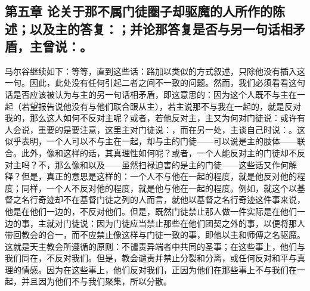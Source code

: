 \section{}


\subsection{第五章 论关于那不属门徒圈子却驱魔的人所作的陈述；以及主的答复：；并论那答复是否与另一句话相矛盾，主曾说：。}

马尔谷继续如下：等等，直到这些话：路加以类似的方式叙述，只除他没有插入这一句。因此，此处没有任何引起二者之间不一致的问题。然而，我们必须看看这句话是否应该被认为与主的另一句话相矛盾，即这意思的：因为这个人既不与主在一起（若望报告说他没有与他们联合跟从主），若主说那不与我在一起的，就是反对我的，那么这人如何不反对主呢？或者，若他反对主，主又为何对门徒说：或许有人会说，重要的是要注意，这里主对门徒说：，而在另一处，主谈自己时说：。这似乎表明，一个人可以不与主在一起，却与主的门徒——可以说是主的肢体——联合。此外，像和这样的话，其真理性如何呢？或者，一个人能反对主的门徒却不反对主吗？不，那么像和以及——虽然扫禄迫害的是主的门徒——这些话又作何解释？但是，真正的意思是这样的：一个人不与他在一起的程度，就是他反对他的程度；同样，一个人不反对他的程度，就是他与他在一起的程度。例如，就这个以基督之名行奇迹却不在基督门徒之列的人而言，就他以基督之名行奇迹这件事来说，他是在他们一边的，不反对他们。但是，既然门徒禁止那人做一件实际是在他们一边的事，主就对门徒说：因为门徒应当禁止那些在他们团契之外的事，以便将那人带回教会的合一，而不应禁止像这样与门徒一致的事，即他以主和师傅之名驱魔。这就是天主教会所遵循的原则：不谴责异端者中共同的圣事；在这些事上，他们与我们同在，不反对我们。但是，教会谴责并禁止分裂和分离，或任何反对和平与真理的情感。因为在这些事上，他们反对我们，正因为他们在那些事上不与我们在一起，并且因为他们不与我们聚集，所以分散。\par

